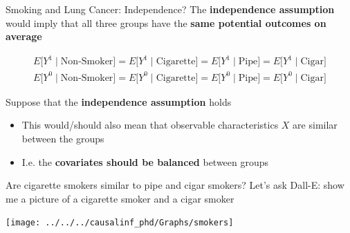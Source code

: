 \documentclass[
  ignorenonframetext,
  aspectratio=169, handout]{beamer}
\providecommand{\tightlist}{%
  \setlength{\itemsep}{0pt}\setlength{\parskip}{0pt}}
\newcommand{\brf}[1]{\textcolor{brickred}{\textbf{#1}}}
\begin{document}
\begin{frame}{Smoking and Lung Cancer: Independence?}
\protect\hypertarget{smoking-and-lung-cancer-independence}{}
The \brf{independence assumption} would imply that all three groups have
the \textbf{same potential outcomes on average}

\begin{align*}
 E\big[Y^1\mid \text{Non-Smoker}\big] =
   E\big[Y^1\mid \text{Cigarette}\big] =
   E\big[Y^1\mid \text{Pipe}\big] =
   E\big[Y^1\mid \text{Cigar}\big]
   \\
   E\big[Y^0\mid \text{Non-Smoker}\big] =
   E\big[Y^0\mid \text{Cigarette}\big]=
   E\big[Y^0\mid \text{Pipe}\big] =
   E\big[Y^0\mid \text{Cigar}\big]
\end{align*}

\vfill

Suppose that the \brf{independence assumption} holds

\begin{itemize}
\tightlist
\item
  This would/should also mean that observable characteristics \(X\) are
  similar between the groups
\item
  I.e. the \textbf{covariates should be balanced} between groups
\end{itemize}
\end{frame}

\begin{frame}{Are cigarette smokers similar to pipe and cigar smokers?}
\protect\hypertarget{are-cigarette-smokers-similar-to-pipe-and-cigar-smokers}{}
Let's ask Dall-E: show me a picture of a cigarette smoker and a cigar
smoker

\begin{center}\texttt{[image: ../../../causalinf\_phd/Graphs/smokers]} \end{center}
\end{frame}
\end{document}
